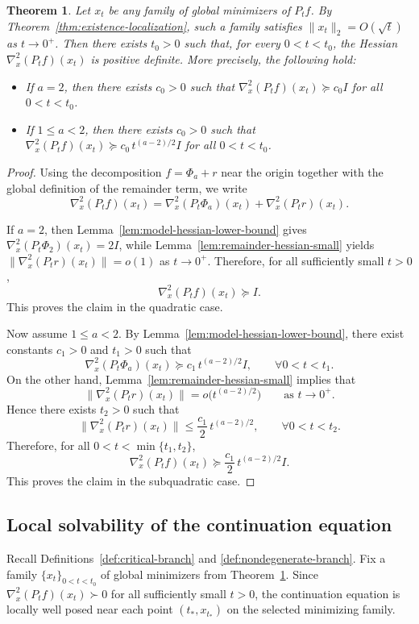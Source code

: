 \documentclass{article}
\newtheorem{theorem}{Theorem}[section]
\begin{document}
\begin{theorem}\label{thm:main-nondegeneracy}
Let $x_t$ be any family of global minimizers of $P_t f$. By Theorem~\ref{thm:existence-localization}, such a family satisfies $\|x_t\|_2=O(\sqrt t)$ as $t\to0^+$. Then there exists $t_0>0$ such that, for every $0<t<t_0$, the Hessian $\nabla_x^2(P_t f)(x_t)$ is positive definite. More precisely, the following hold:
\begin{itemize}
\item If $a=2$, then there exists $c_0>0$ such that $\nabla_x^2(P_t f)(x_t)\succeq c_0 I$ for all $0<t<t_0$.
\item If $1\le a<2$, then there exists $c_0>0$ such that $\nabla_x^2(P_t f)(x_t)\succeq c_0\,t^{(a-2)/2}I$ for all $0<t<t_0$.
\end{itemize}
\end{theorem}

\begin{proof}
Using the decomposition $f=\Phi_a+r$ near the origin together with the global definition of the remainder term, we write
$$\nabla_x^2(P_t f)(x_t)=\nabla_x^2(P_t\Phi_a)(x_t)+\nabla_x^2(P_t r)(x_t).$$

If $a=2$, then Lemma~\ref{lem:model-hessian-lower-bound} gives $\nabla_x^2(P_t\Phi_2)(x_t)=2I$, while Lemma~\ref{lem:remainder-hessian-small} yields $\|\nabla_x^2(P_t r)(x_t)\|=o(1)$ as $t\to0^+$. Therefore, for all sufficiently small $t>0$,
$$\nabla_x^2(P_t f)(x_t)\succeq I.$$
This proves the claim in the quadratic case.

Now assume $1\le a<2$. By Lemma~\ref{lem:model-hessian-lower-bound}, there exist constants $c_1>0$ and $t_1>0$ such that
$$\nabla_x^2(P_t\Phi_a)(x_t)\succeq c_1\,t^{(a-2)/2}I,\qquad \forall 0<t<t_1.$$
On the other hand, Lemma~\ref{lem:remainder-hessian-small} implies that
$$\|\nabla_x^2(P_t r)(x_t)\|=o\bigl(t^{(a-2)/2}\bigr)\qquad\text{as }t\to0^+.$$
Hence there exists $t_2>0$ such that
$$\|\nabla_x^2(P_t r)(x_t)\|\le \frac{c_1}{2}\,t^{(a-2)/2},\qquad \forall 0<t<t_2.$$
Therefore, for all $0<t<\min\{t_1,t_2\}$,
$$\nabla_x^2(P_t f)(x_t)\succeq \frac{c_1}{2}\,t^{(a-2)/2}I.$$
This proves the claim in the subquadratic case.
\end{proof}

\subsection{Local solvability of the continuation equation}
Recall Definitions~\ref{def:critical-branch} and \ref{def:nondegenerate-branch}. Fix a family $\{x_t\}_{0<t<t_0}$ of global minimizers from Theorem~\ref{thm:main-nondegeneracy}. Since $\nabla_x^2(P_t f)(x_t)\succ 0$ for all sufficiently small $t>0$, the continuation equation is locally well posed near each point $(t_*,x_{t_*})$ on the selected minimizing family.
\end{document}
